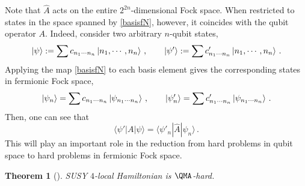\documentclass[11pt]{article}
\numberwithin{equation}{section}
\newcommand\equ[1] {\begin{equation}#1\end{equation}}
\renewcommand\( {\left(}
\renewcommand\) {\right)}
\newtheorem{thm}{Theorem}
\renewcommand{\braket}[1]{\langle #1 \rangle}
\begin{document}
Note that $\hat A$ acts on the entire $2^{2n}$-dimensional Fock space. When restricted to states in the space spanned by \eqref{basisfN}, however, it coincides with the qubit operator $A$. Indeed, consider two arbitrary $n$-qubit states, 
\equ{
\ket{\psi}:=\sum c_{n_{1}\cdots n_{n}}\ket{n_{1},\cdots,n_{n}}\,,\qquad \ket{\psi'}:=\sum c'_{n_{1}\cdots n_{n}}\ket{n_{1},\cdots,n_{n}}\,.
}
Applying the map \eqref{basisfN} to each basis element gives the corresponding states in fermionic Fock space,
\equ{
\ket{\psi_n}=\sum c_{n_{1}\cdots n_{n}}\ket{\psi_{n_{1}\cdots n_{n}}}\,,\qquad \ket{\psi_n'}=\sum c'_{n_{1}\cdots n_{n}}\ket{\psi_{n_{1}\cdots n_{n}}}\,.
}
Then, one can see that 
\equ{\label{eq:same_op}
\braket{\psi'|A|\psi}= \braket{\psi'_n|\hat A|\psi_n}\,.
}
This will play an important role in the reduction from hard problems in qubit space to hard problems in fermionic Fock space.  

\begin{thm}[]\label{thmQMAhard}
 {\sc SUSY $4$-local Hamiltonian} is $\QMA$-hard. 
\end{thm}
\end{document}
